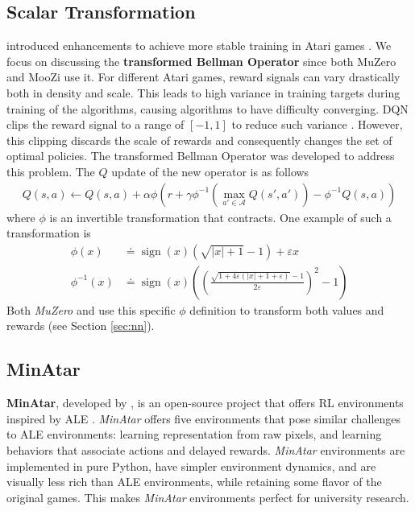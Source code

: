 \subsection{Scalar Transformation} \label{sec:scalar_transform}
\citeauthor{ObserveLookFurther_Pohlen.Piot.ea_2018} introduced enhancements to achieve more stable training in Atari games \cite{ObserveLookFurther_Pohlen.Piot.ea_2018}.
We focus on discussing the \textbf{transformed Bellman Operator} since both MuZero and MooZi use it.
For different Atari games, reward signals can vary drastically both in density and scale.
This leads to high variance in training targets during training of the algorithms, causing algorithms to have difficulty converging.
DQN clips the reward signal to a range of $[-1, 1]$ to reduce such variance \cite{PlayingAtariDeep_Mnih.Kavukcuoglu.ea_2013}.
However, this clipping discards the scale of rewards and consequently changes the set of optimal policies.
The transformed Bellman Operator was developed to address this problem.
The $Q$ update of the new operator is as follows
\begin{align*}
    Q(s, a) \leftarrow Q(s, a) + \alpha \phi \left(r +\gamma \phi^{-1}\left( \max _{a' \in \mathcal{A}} Q\left(s', a'\right)\right) - \phi^{-1} Q(s, a)\right)
\end{align*}
where $\phi$ is an invertible transformation that contracts.
One example of such a transformation is
\begin{align*}
    \phi(x)       & \doteq \operatorname{sign}(x)\left(\sqrt{|x|+1}-1\right)+\varepsilon x  \\
    \phi^{-1}(x)  & \doteq \operatorname{sign}(x)\left(\left(\frac{\sqrt{1+4 \varepsilon(|x|+1+\varepsilon)}-1}{2 \varepsilon}\right)^{2}-1\right)
\end{align*}
Both \textit{MuZero} and \moozi use this specific $\phi$ definition to transform both values and rewards (see Section \ref{sec:nn}).

\subsection{MinAtar} \label{sec:min_atar}
\textbf{MinAtar}, developed by \citeauthor{MinAtarAtariInspiredTestbed_Young.Tian_2019}, is an open-source project that offers RL environments inspired by ALE \cite{MinAtarAtariInspiredTestbed_Young.Tian_2019}.
\textit{MinAtar} offers five environments that pose similar challenges to ALE environments: learning representation from raw pixels, and learning behaviors that associate actions and delayed rewards.
\textit{MinAtar} environments are implemented in pure Python, have simpler environment dynamics, and are visually less rich than ALE environments, while retaining some flavor of the original games.
This makes \textit{MinAtar} environments perfect for university research.

